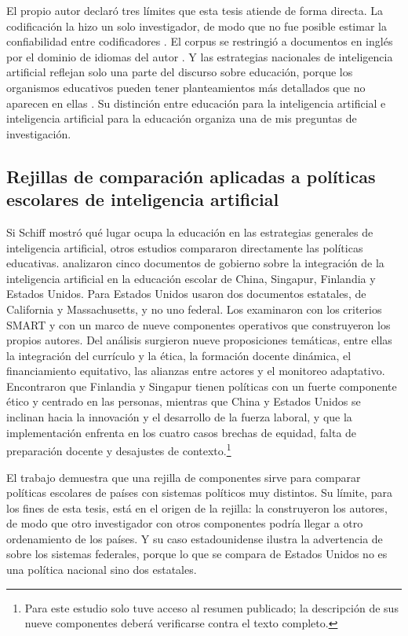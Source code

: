 El propio autor declaró tres límites que esta tesis atiende de forma directa. La
codificación la hizo un solo investigador, de modo que no fue posible estimar la
confiabilidad entre codificadores \citep[p.~533]{schiff2022education}. El corpus se
restringió a documentos en inglés por el dominio de idiomas del autor
\citep[p.~552]{schiff2022education}. Y las estrategias nacionales de inteligencia artificial
reflejan solo una parte del discurso sobre educación, porque los organismos educativos
pueden tener planteamientos más detallados que no aparecen en ellas
\citep[p.~550]{schiff2022education}. Su distinción entre educación para la inteligencia
artificial e inteligencia artificial para la educación organiza una de mis preguntas de
investigación.

\subsection{Rejillas de comparación aplicadas a políticas escolares de inteligencia artificial}
\label{subsec:ea-rejillas}

Si Schiff mostró qué lugar ocupa la educación en las estrategias generales de inteligencia
artificial, otros estudios compararon directamente las políticas educativas. \citet{kundu2025aipolicies}
analizaron cinco documentos de gobierno sobre la integración de la inteligencia artificial
en la educación escolar de China, Singapur, Finlandia y Estados Unidos. Para Estados Unidos
usaron dos documentos estatales, de California y Massachusetts, y no uno federal. Los
examinaron con los criterios SMART y con un marco de nueve componentes operativos que
construyeron los propios autores. Del análisis surgieron nueve proposiciones temáticas,
entre ellas la integración del currículo y la ética, la formación docente dinámica, el
financiamiento equitativo, las alianzas entre actores y el monitoreo adaptativo.
Encontraron que Finlandia y Singapur tienen políticas con un fuerte componente ético y
centrado en las personas, mientras que China y Estados Unidos se inclinan hacia la
innovación y el desarrollo de la fuerza laboral, y que la implementación enfrenta en los
cuatro casos brechas de equidad, falta de preparación docente y desajustes de
contexto.\footnote{Para este estudio solo tuve acceso al resumen publicado; la descripción
de sus nueve componentes deberá verificarse contra el texto completo.}

El trabajo demuestra que una rejilla de componentes sirve para comparar políticas
escolares de países con sistemas políticos muy distintos. Su límite, para los fines de esta
tesis, está en el origen de la rejilla: la construyeron los autores, de modo que otro
investigador con otros componentes podría llegar a otro ordenamiento de los países. Y su
caso estadounidense ilustra la advertencia de \citet{bray1995levels} sobre los sistemas
federales, porque lo que se compara de Estados Unidos no es una política nacional sino dos
estatales.

